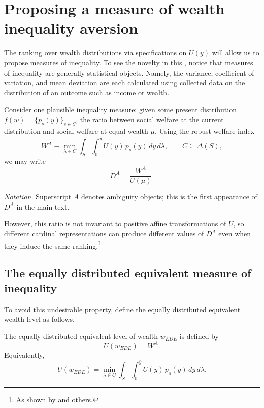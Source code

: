 \documentclass[../../../00-main.tex]{subfiles}
\begin{document}
\section{Proposing a measure of wealth inequality aversion}
\label{sec:Altmeasure}


\par The ranking over wealth distributions via specifications on $U(y)$ will allow us to propose measures of inequality. To see the novelty in this , notice that measures of inequality are generally statistical objects. Namely, the variance, coefficient of variation, and mean deviation are each calculated using collected data on the distribution of an outcome such as income or wealth.

\par Consider one plausible inequality measure: given some present distribution $f(w)=\{p_s(y)\}_{s\in S}$, the ratio between social welfare at the current distribution and social welfare at equal wealth $\mu$. Using the robust welfare index
\[
W^{A} \equiv \min_{\lambda \in C}\int_S\int_0^{\bar y} U(y)\,p_s(y)\,dy\,d\lambda,
\qquad C\subseteq \Delta(S),
\]
we may write
\[
D^{A} = \frac{W^{A}}{U(\mu)}.
\]

\par \textit{Notation.} Superscript $A$ denotes ambiguity objects; this is the first appearance of $D^{A}$ in the main text.

\par However, this ratio is not invariant to positive affine transformations of $U$, so different cardinal representations can produce different values of $D^{A}$ even when they induce the same ranking.\footnote{As shown by \cite{hd20} and others.}

\subsection{The equally distributed equivalent measure of inequality}

\par To avoid this undesirable property, define the equally distributed equivalent wealth level as follows.

\begin{dfn}
The equally distributed equivalent level of wealth $w_{EDE}$ is defined by
\[
U(w_{EDE}) = W^{A}.
\]
Equivalently,
\[
U(w_{EDE}) = \min_{\lambda \in C}\int_S\int_0^{\bar y} U(y)\,p_s(y)\,dy\,d\lambda.
\]
\end{dfn}
\end{document}
